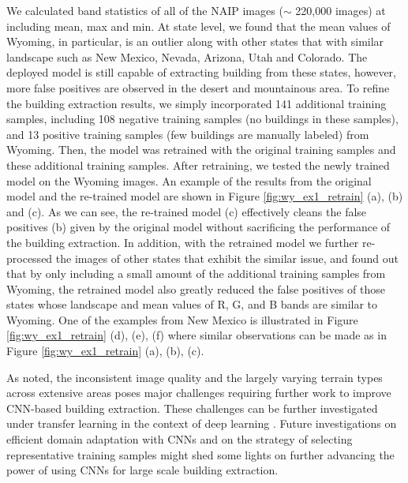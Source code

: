 \documentclass[journal]{IEEEtran}
\begin{document}
We calculated band statistics of all of the NAIP images ($\sim$ 220,000 images) at including mean, max and min. At state level, we found that the mean values of Wyoming, in particular, is an outlier along with other states that with similar landscape such as New Mexico, Nevada, Arizona, Utah and Colorado. The deployed model is still capable of extracting building from these states, however, more false positives are observed in the desert and mountainous area. To refine the building extraction results, we simply incorporated 141 additional training samples, including 108 negative training samples (no buildings in these samples), and 13 positive training samples (few buildings are manually labeled) from Wyoming. Then, the model was retrained with the original training samples and these additional training samples. After retraining, we tested the newly trained model on the Wyoming images. An example of the results from the original model and the re-trained model are shown in Figure \ref{fig:wy_ex1_retrain} (a), (b) and (c). As we can see, the re-trained model (c) effectively cleans the false positives (b) given by the original model without sacrificing the performance of the building extraction. In addition, with the retrained model we further re-processed the images of other states that exhibit the similar issue, and found out that by only including a small amount of the additional training samples from Wyoming, the retrained model also greatly reduced the false positives of those states whose landscape and mean values of R, G, and B bands are similar to Wyoming. One of the examples from New Mexico is illustrated in Figure \ref{fig:wy_ex1_retrain} (d), (e), (f) where similar observations can be made as in Figure \ref{fig:wy_ex1_retrain} (a), (b), (c).

As noted, the inconsistent image quality and the largely varying terrain types across extensive areas poses major challenges requiring further work to improve CNN-based building extraction. These challenges can be further investigated under transfer learning in the context of deep learning \cite{Yosinski2014}. Future investigations on efficient domain adaptation with CNNs and on the strategy of selecting representative training samples \cite{GeYu2017} might shed some lights on further advancing the power of using CNNs for large scale building extraction. 
\end{document}
